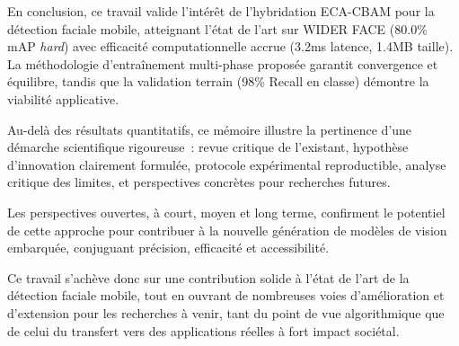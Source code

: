 \begin{onehalfspace}
\hspace{0.65 cm}En conclusion, ce travail valide l'intérêt de l'hybridation ECA-CBAM pour la détection faciale mobile, atteignant l'état de l'art sur WIDER FACE (80.0\% mAP \textit{hard}) avec efficacité computationnelle accrue (3.2ms latence, 1.4MB taille). La méthodologie d'entraînement multi-phase proposée garantit convergence et équilibre, tandis que la validation terrain (98\% Recall en classe) démontre la viabilité applicative.

\hspace{0.65 cm}Au-delà des résultats quantitatifs, ce mémoire illustre la pertinence d'une démarche scientifique rigoureuse~: revue critique de l'existant, hypothèse d'innovation clairement formulée, protocole expérimental reproductible, analyse critique des limites, et perspectives concrètes pour recherches futures.

\hspace{0.65 cm}Les perspectives ouvertes, à court, moyen et long terme, confirment le potentiel de cette approche pour contribuer à la nouvelle génération de modèles de vision embarquée, conjuguant précision, efficacité et accessibilité.

\hspace{0.65 cm}Ce travail s'achève donc sur une contribution solide à l'état de l'art de la détection faciale mobile, tout en ouvrant de nombreuses voies d'amélioration et d'extension pour les recherches à venir, tant du point de vue algorithmique que de celui du transfert vers des applications réelles à fort impact sociétal.

\end{onehalfspace}
